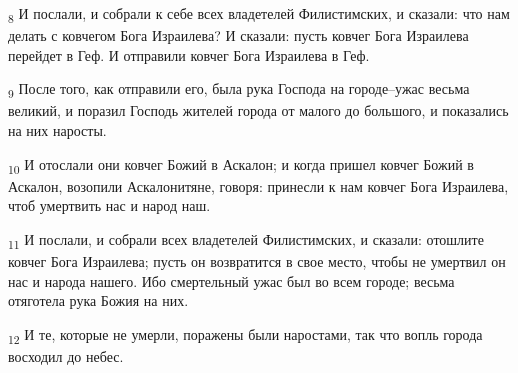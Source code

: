 \begin{tcolorbox}
\textsubscript{8} И послали, и собрали к себе всех владетелей Филистимских, и сказали: что нам делать с ковчегом Бога Израилева? И сказали: пусть ковчег Бога Израилева перейдет в Геф. И отправили ковчег Бога Израилева в Геф.
\end{tcolorbox}
\begin{tcolorbox}
\textsubscript{9} После того, как отправили его, была рука Господа на городе--ужас весьма великий, и поразил Господь жителей города от малого до большого, и показались на них наросты.
\end{tcolorbox}
\begin{tcolorbox}
\textsubscript{10} И отослали они ковчег Божий в Аскалон; и когда пришел ковчег Божий в Аскалон, возопили Аскалонитяне, говоря: принесли к нам ковчег Бога Израилева, чтоб умертвить нас и народ наш.
\end{tcolorbox}
\begin{tcolorbox}
\textsubscript{11} И послали, и собрали всех владетелей Филистимских, и сказали: отошлите ковчег Бога Израилева; пусть он возвратится в свое место, чтобы не умертвил он нас и народа нашего. Ибо смертельный ужас был во всем городе; весьма отяготела рука Божия на них.
\end{tcolorbox}
\begin{tcolorbox}
\textsubscript{12} И те, которые не умерли, поражены были наростами, так что вопль города восходил до небес.
\end{tcolorbox}
